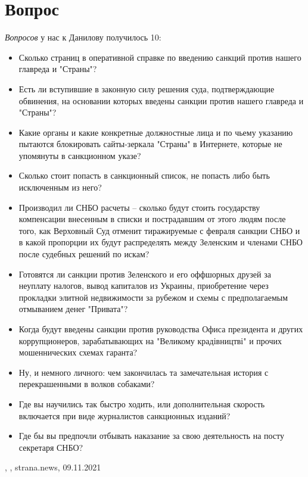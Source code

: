  
 
 
 
 
\chapter{Вопрос}

\emph{Вопросов} у нас к Данилову получилось 10:
\begin{itemize} %
\item Сколько страниц в оперативной справке по введению санкций против нашего главреда и "Страны"?
\item Есть ли вступившие в законную силу решения суда, подтверждающие обвинения, на основании которых введены санкции против нашего главреда и "Страны"?
\item Какие органы и какие конкретные должностные лица и по чьему указанию пытаются блокировать сайты-зеркала "Страны" в Интернете, которые не упомянуты в санкционном указе?
\item Сколько стоит попасть в санкционный список, не попасть либо быть исключенным из него?
\item Производил ли СНБО расчеты – сколько будут стоить государству компенсации внесенным в списки и пострадавшим от этого людям после того, как Верховный Суд отменит тиражируемые с февраля санкции СНБО и в какой пропорции их будут распределять между Зеленским и членами СНБО после судебных решений по искам?
\item Готовятся ли санкции против Зеленского и его оффшорных друзей за неуплату налогов, вывод капиталов из Украины, приобретение через прокладки элитной недвижимости за рубежом и схемы с предполагаемым отмыванием денег "Привата"?
\item Когда будут введены санкции против руководства Офиса президента и других коррупционеров, зарабатывающих на "Великому крадівництві" и прочих мошеннических схемах гаранта?
\item Ну, и немного личного: чем закончилась та замечательная история с перекрашенными в волков собаками?
\item Где вы научились так быстро ходить, или дополнительная скорость включается при виде журналистов санкционных изданий?
\item Где бы вы предпочли отбывать наказание за свою деятельность на посту секретаря СНБО?
\end{itemize} %
, 
, strana.news, 09.11.2021

